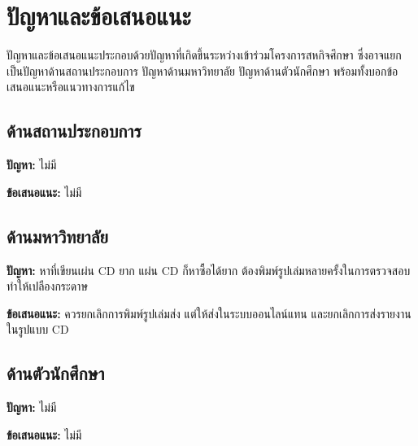 \chapter{ปัญหาและข้อเสนอแนะ}
\label{chapter:result}

ปัญหาและข้อเสนอแนะประกอบด้วยปัญหาที่เกิดขึ้นระหว่างเข้าร่วมโครงการสหกิจศึกษา ซึ่งอาจแยกเป็นปัญหาด้านสถานประกอบการ ปัญหาด้านมหาวิทยาลัย ปัญหาด้านตัวนักศึกษา พร้อมทั้งบอกข้อเสนอแนะหรือแนวทางการแก้ไข 

\section{ด้านสถานประกอบการ}

\textbf{ปัญหา:} ไม่มี

\textbf{ข้อเสนอแนะ:} ไม่มี

\section{ด้านมหาวิทยาลัย}

\textbf{ปัญหา:} หาที่เขียนเผ่น CD ยาก แผ่น CD ก็หาซื้อได้ยาก ต้องพิมพ์รูปเล่มหลายครั้งในการตรวจสอบ ทำให้เปลืองกระดาษ

\textbf{ข้อเสนอแนะ:} ควรยกเลิกการพิมพ์รูปเล่มส่ง แต่ให้ส่งในระบบออนไลน์แทน และยกเลิกการส่งรายงานในรูปแบบ CD

\section{ด้านตัวนักศึกษา}

\textbf{ปัญหา:} ไม่มี

\textbf{ข้อเสนอแนะ:} ไม่มี